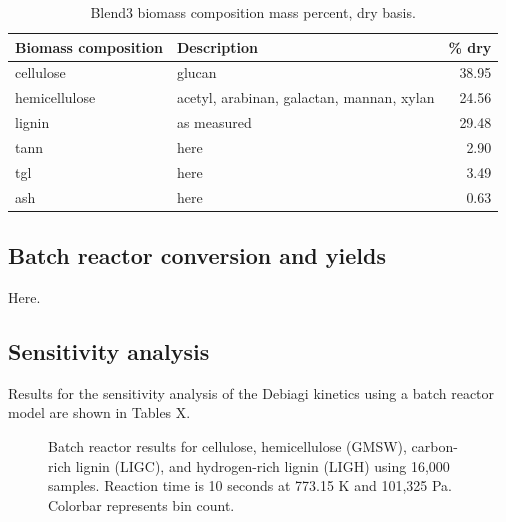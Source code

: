 \begin{table}[H]
    \centering
    \caption{Blend3 biomass composition mass percent, dry basis.}
    \begin{tabular}{llr}
        \toprule
        Biomass composition & Description & \% dry \\
        \midrule
        cellulose     & glucan                                    & 38.95 \\
        hemicellulose & acetyl, arabinan, galactan, mannan, xylan & 24.56 \\
        lignin        & as measured                               & 29.48 \\
        tann          & here & 2.90  \\
        tgl           & here & 3.49  \\
        ash           & here & 0.63  \\
        \bottomrule
    \end{tabular}
\end{table}

\subsection{Batch reactor conversion and yields}

Here.

\subsection{Sensitivity analysis}

Results for the sensitivity analysis of the Debiagi kinetics using a batch reactor model are shown in Tables X.

\begin{figure}[H]
    \centering
    \caption{Batch reactor results for cellulose, hemicellulose (GMSW), carbon-rich lignin (LIGC), and hydrogen-rich lignin (LIGH) using 16,000 samples. Reaction time is 10 seconds at 773.15 K and 101,325 Pa. Colorbar represents bin count.}
\end{figure}

